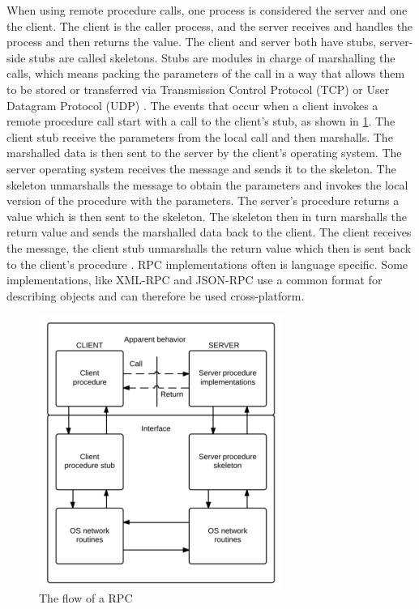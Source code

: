 When using remote procedure calls, one process is considered the server and one the client. The client is the caller process, and the server receives and handles the process and then returns the value. The client and server both have stubs, server-side stubs are called skeletons. Stubs are modules in charge of marshalling the calls, which means packing the parameters of the call in a way that allows them to be stored or transferred via Transmission Control Protocol (TCP) or User Datagram Protocol (UDP) \cite{rfc5531}. 
The events that occur when a client invokes a remote procedure call start with a call to the client's stub, as shown in \ref{rpcflow}. The client stub receive the parameters from the local call and then marshalls. The marshalled data is then sent to the server by the client's operating system. The server operating system receives the message and sends it to the skeleton. The skeleton unmarshalls the message  to obtain the parameters and invokes the local version of the procedure with the parameters. The server's procedure returns a value which is then sent to the skeleton. The skeleton then in turn marshalls the return value and sends the marshalled data back to the client. The client receives the message, the client stub unmarshalls the return value which then is sent back to the client's procedure \cite{Lewandowski97interprocesscommunication}. RPC implementations often is language specific. Some implementations, like XML-RPC and 
JSON-RPC use a common format for describing objects and can therefore be used cross-platform.

\begin{figure}[ht]
		\centering	\includegraphics{part_2/remote_procedure_calls/Rpcflow300.png}
		\caption{The flow of a RPC}
		\label{rpcflow} 
\end{figure}

